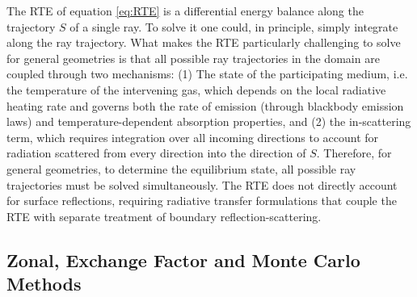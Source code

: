 \documentclass[preprint,1p,times]{elsarticle}
\theoremstyle{plain}
\theoremstyle{definition}
\theoremstyle{remark}
\begin{document}
The RTE of equation \eqref{eq:RTE} is a differential energy balance along the trajectory $S$ of a single ray. To solve it one could, in principle, simply integrate along the ray trajectory. What makes the RTE particularly challenging to solve for general geometries is that all possible ray trajectories in the domain are coupled through two mechanisms: (1) The state of the participating medium, i.e. the temperature of the intervening gas, which depends on the local radiative heating rate and governs both the rate of emission (through blackbody emission laws) and temperature-dependent absorption properties, and (2) the in-scattering term, which requires integration over all incoming directions to account for radiation scattered from every direction into the direction of $S$. Therefore, for general geometries, to determine the equilibrium state, all possible ray trajectories must be solved simultaneously. The RTE does not directly account for surface reflections, requiring radiative transfer formulations that couple the RTE with separate treatment of boundary reflection-scattering.

\subsection{Zonal, Exchange Factor and Monte Carlo Methods}
\end{document}
